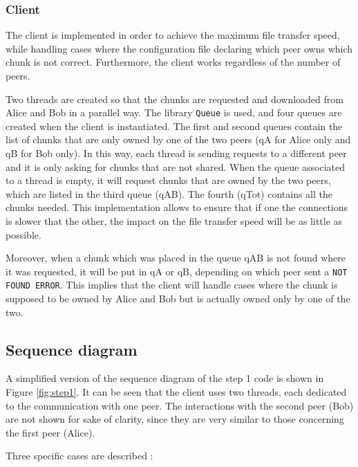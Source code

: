 \subsubsection{Client}

The client is implemented in order to achieve the maximum file transfer speed, while handling cases where the configuration file declaring which peer owns which chunk is not correct. Furthermore, the client works regardless of the number of peers.

Two threads are created so that the chunks are requested and downloaded from Alice and Bob in a parallel way. The library \texttt{Queue} is used, and four queues are created when the client is instantiated. The first and second queues contain the list of chunks that are only owned by one of the two peers (qA for Alice only and qB for Bob only). In this way, each thread is sending requests to a different peer and it is only asking for chunks that are not shared. When the queue associated to a thread is empty, it will request chunks that are owned by the two peers, which are listed in the third queue (qAB). The fourth (qTot) contains all the chunks needed. This implementation allows to ensure that if one the connections is slower that the other, the impact on the file transfer speed will be as little as possible.

Moreover, when a chunk which was placed in the queue qAB is not found where it was requested, it will be put in qA or qB, depending on which peer sent a \texttt{NOT FOUND ERROR}. This implies that the client will handle cases where the chunk is supposed to be owned by Alice and Bob but is actually owned only by one of the two.

\subsection{Sequence diagram}

A simplified version of the sequence diagram of the step 1 code is shown in Figure \ref{fig:step1}. It can be seen that the client uses two threads, each dedicated to the communication with one peer. The interactions with the second peer (Bob) are not shown for sake of clarity, since they are very similar to those concerning the first peer (Alice).

Three specific cases are described : 

